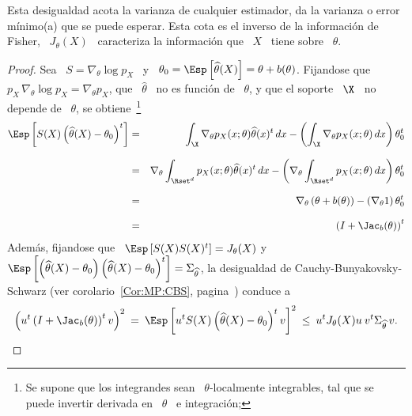 %
\noindent Esta desigualdad  acota la varianza de cualquier  estimador, \ie da la
varianza o error m\'inimo(a) que se puede esperar. Esta cota es el inverso de la
informaci\'on de Fisher, \ie \  $J_\theta(X)$ \ caracteriza la informaci\'on que
\ $X$ \ tiene sobre \ $\theta$.
%
\begin{proof}
  Sea  \   $S  =  \nabla_\theta  \log   p_X$  \  y  \   $\theta_0  =  \Esp\left[
    \widehat{\theta}(X) \right] = \theta +  b(\theta)$.  Fijandose que \ $p_X \,
  \nabla_\theta \log p_X = \nabla_\theta  p_X$, que \ $\widehat{\theta}$ \ no es
  funci\'on de \ $\theta$,  y que el soporte \ $\X$ \  no depende de \ $\theta$,
  se obtiene~\footnote{Se supone que  los integrandes sean \ $\theta$-localmente
    integrables,  tal  que  se  puede  invertir  derivada  en  \  $\theta$  \  e
    integraci\'on;  }
  \begin{eqnarray*}
  \Esp\left[ S(X) \left( \widehat{\theta}(X) - \theta_0 \right)^t \right] & = &
  \int_\X \nabla_\theta p_X(x;\theta) \widehat{\theta}(x)^t \, dx - \left(
  \int_\X \nabla_\theta p_X(x;\theta) \, dx \right) \theta_0^t\\[2.5mm]
  & = & \nabla_\theta \int_{\Rset^d} p_X(x;\theta) \widehat{\theta}(x)^t \, dx -
  \left( \nabla_\theta \int_{\Rset^d} p_X(x;\theta) \, dx \right)
  \theta_0^t\\[2.5mm]
  & = & \nabla_\theta \left( \theta + b(\theta) \right)  - 
  \left( \nabla_\theta 1 \right) \theta_0^t\\[2.5mm]
  & = & \left( I + \Jac_b(\theta) \right)^t
  \end{eqnarray*}
  Adem\'as, fijandose  que \  $\Esp\left[ S(X) S(X)^t  \right] =  J_\theta(X)$ y
  $\Esp\left[   \left(    \widehat{\theta}(X)   -   \theta_0    \right)   \left(
      \widehat{\theta}(X)      -      \theta_0      \right)^t     \right]      =
  \Sigma_{\widehat{\theta}}$, la  desigualdad de Cauchy-Bunyakovsky-Schwarz (ver
  corolario~\ref{Cor:MP:CBS}, pagina~\pageref{Cor:MP:CBS})
  conduce a
  \[
  \left( u^t \left( I + \Jac_b(\theta)  \right)^t v \right)^2 \: = \: \Esp\left[
    u^t S(X) \left( \widehat{\theta}(X) -  \theta_0 \right)^t v \right]^2 \: \le
  \: u^t J_\theta(X) u \: v^t \Sigma_{\widehat{\theta}} \, v.
\]
\end{proof}
